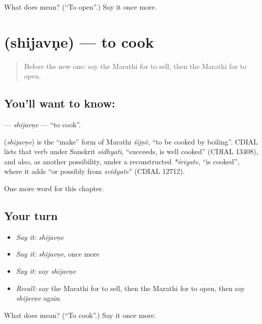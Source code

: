 \begin{tcolorbox}[breakable,colback=teal!4,colframe=teal!35!black,title={Before you move on}]
What does  mean? (\textquotedblleft{}To open\textquotedblright{}.) Say it once more.
\end{tcolorbox}
\section[\texorpdfstring{\mr{शिजवणे} (shijavṇe)}{शिजवणे (shijavṇe)}]{ (shijavṇe) — to cook}

\label{lesson:MR-C78-shijavne}



\begin{quote}
Before the new one: say the Marathi for to sell, then the Marathi for to open.
\end{quote}

\subsection*{You'll want to know: }
\textbf{} — \emph{shijavṇe} — \textquotedblleft{}to cook\textquotedblright{}.

\begin{cousinweb}
\textbf{} (\emph{shijavṇe}) is the \textquotedblleft{}make\textquotedblright{} form of Marathi \emph{śijṇẽ}, \textquotedblleft{}to be cooked by boiling\textquotedblright{}. CDIAL lists that verb under Sanskrit \emph{sidhyati}, \textquotedblleft{}succeeds, is well cooked\textquotedblright{} (CDIAL 13408), and also, as another possibility, under a reconstructed \emph{*śrīyate}, \textquotedblleft{}is cooked\textquotedblright{}, where it adds \textquotedblleft{}or possibly from \emph{svidyate}\textquotedblright{} (CDIAL 12712).
\end{cousinweb}

\begin{grammarlens}[title={What you've built}]
One more word for this chapter.
\end{grammarlens}

\subsection*{Your turn}
\begin{itemize}
\raggedright
  \item \emph{Say it:} \emph{shijavṇe}
  \item \emph{Say it:} \emph{shijavṇe}, once more
  \item \emph{Say it:} say \emph{shijavṇe}
  \item \emph{Recall:} say the Marathi for to sell, then the Marathi for to open, then say \emph{shijavṇe} again
\end{itemize}

\begin{tcolorbox}[breakable,colback=teal!4,colframe=teal!35!black,title={Before you move on}]
What does  mean? (\textquotedblleft{}To cook\textquotedblright{}.) Say it once more.
\end{tcolorbox}
